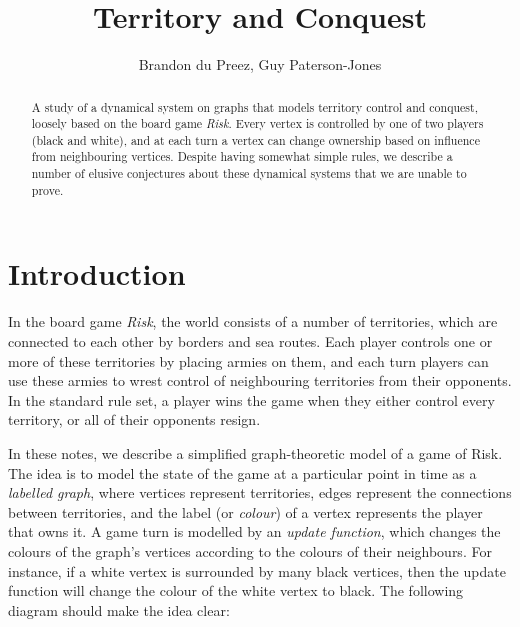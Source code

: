 \documentclass{article}
\theoremstyle{plain}
\theoremstyle{definition}
\begin{document}

\title{Territory and Conquest}
\author{Brandon du Preez, Guy Paterson-Jones}

\maketitle

\begin{abstract}
  \noindent A study of a dynamical system on graphs that models territory control and conquest, loosely based on the board game \emph{Risk}. Every vertex is controlled by one of two players (black and white), and at each turn a vertex can change ownership based on influence from neighbouring vertices. Despite having somewhat simple rules, we describe a number of elusive conjectures about these dynamical systems that we are unable to prove. \cite{KrausEtAl1990}
\end{abstract}

\section{Introduction}

In the board game \emph{Risk}, the world consists of a number of territories, which are connected to each other by borders and sea routes. Each player controls one or more of these territories by placing armies on them, and each turn players can use these armies to wrest control of neighbouring territories from their opponents. In the standard rule set, a player wins the game when they either control every territory, or all of their opponents resign.

In these notes, we describe a simplified graph-theoretic model of a game of Risk. The idea is to model the state of the game at a particular point in time as a \emph{labelled graph}, where vertices represent territories, edges represent the connections between territories, and the label (or \emph{colour}) of a vertex represents the player that owns it. A game turn is modelled by an \emph{update function}, which changes the colours of the graph's vertices according to the colours of their neighbours. For instance, if a white vertex is surrounded by many black vertices, then the update function will change the colour of the white vertex to black. The following diagram should make the idea clear:
\end{document}
